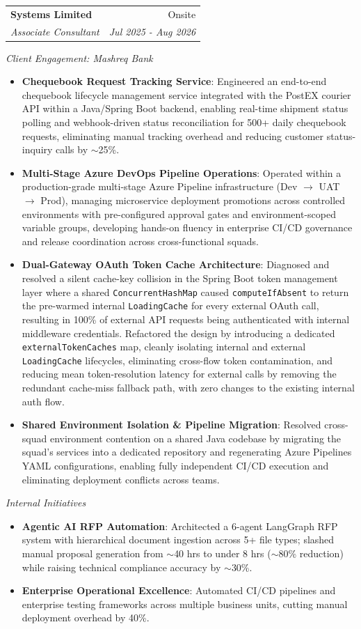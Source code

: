 \documentclass[a4paper,20pt]{article}
\makeatletter
\newcommand{\resumeItem}[2]{
  \item\small{
    \textbf{#1}{: #2 \vspace{-2pt}}
  }
}
\newcommand{\resumeSubheading}[4]{
  \vspace{-1pt}\item
    \begin{tabular*}{0.97\textwidth}{l@{\extracolsep{\fill}}r}
      \textbf{#1} & #2 \\
      \textit{#3} & \textit{#4} \\
    \end{tabular*}\vspace{-5pt}
}
\newcommand{\resumeSubSubheading}[1]{%
  \par\vspace{4pt}%
  \noindent\textit{\small #1}%
  \par\vspace{-4pt}%
}
\newcommand{\resumeItemListStart}{\begin{itemize}}
\newcommand{\resumeItemListEnd}{\end{itemize}\vspace{-5pt}}
\makeatother
\begin{document}
    \resumeSubheading
      {Systems Limited}{Onsite}
      {Associate Consultant}{Jul 2025 - Aug 2026}
      \resumeSubSubheading{Client Engagement: Mashreq Bank}
      \resumeItemListStart
        \resumeItem{Chequebook Request Tracking Service}{Engineered an end-to-end chequebook lifecycle management service integrated with the PostEX courier API within a Java/Spring Boot backend, enabling real-time shipment status polling and webhook-driven status reconciliation for 500+ daily chequebook requests, eliminating manual tracking overhead and reducing customer status-inquiry calls by $\sim$25\%.}
        \resumeItem{Multi-Stage Azure DevOps Pipeline Operations}{Operated within a production-grade multi-stage Azure Pipeline infrastructure (Dev $\rightarrow$ UAT $\rightarrow$ Prod), managing microservice deployment promotions across controlled environments with pre-configured approval gates and environment-scoped variable groups, developing hands-on fluency in enterprise CI/CD governance and release coordination across cross-functional squads.}
        \resumeItem{Dual-Gateway OAuth Token Cache Architecture}{Diagnosed and resolved a silent cache-key collision in the Spring Boot token management layer where a shared \texttt{ConcurrentHashMap} caused \texttt{computeIfAbsent} to return the pre-warmed internal \texttt{LoadingCache} for every external OAuth call, resulting in 100\% of external API requests being authenticated with internal middleware credentials. Refactored the design by introducing a dedicated \texttt{externalTokenCaches} map, cleanly isolating internal and external \texttt{LoadingCache} lifecycles, eliminating cross-flow token contamination, and reducing mean token-resolution latency for external calls by removing the redundant cache-miss fallback path, with zero changes to the existing internal auth flow.}
        \resumeItem{Shared Environment Isolation \& Pipeline Migration}{Resolved cross-squad environment contention on a shared Java codebase by migrating the squad's services into a dedicated repository and regenerating Azure Pipelines YAML configurations, enabling fully independent CI/CD execution and eliminating deployment conflicts across teams.}
      \resumeItemListEnd
      \resumeSubSubheading{Internal Initiatives}
      \resumeItemListStart
        \resumeItem{Agentic AI RFP Automation}{Architected a 6-agent LangGraph RFP system with hierarchical document ingestion across 5+ file types; slashed manual proposal generation from $\sim$40 hrs to under 8 hrs ($\sim$80\% reduction) while raising technical compliance accuracy by $\sim$30\%.}
        \resumeItem{Enterprise Operational Excellence}{Automated CI/CD pipelines and enterprise testing frameworks across multiple business units, cutting manual deployment overhead by 40\%.}
      \resumeItemListEnd
\end{document}

